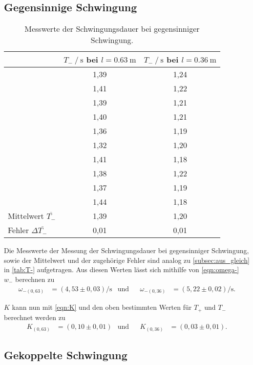 \subsection{Gegensinnige Schwingung}
\label{subsec:aus_gegen}
\begin{table}[H]
  \centering
  \caption{Messwerte der Schwingungsdauer bei gegensinniger Schwingung.}
  \label{tab:T-}
  \begin{tabular}{l S S}
    \toprule
     & {$T_- \mathbin{/} \si{\second}$ bei $l=\qty{0.63}{\meter}$} & {$T_- \mathbin{/} \si{\second}$ bei $l=\qty{0.36}{\meter}$}\\
    \midrule
      &1,39 & 1,24\\
      &1,41 & 1,22\\
      &1,39 & 1,21\\
      &1,40 & 1,21\\
      &1,36 & 1,19\\
      &1,32 & 1,20\\
      &1,41 & 1,18\\
      &1,38 & 1,22\\
      &1,37 & 1,19\\
      &1,44 & 1,18\\
    \midrule
      Mittelwert $\overline{T_-}$& 1,39 & 1,20\\
      Fehler $\Delta \overline{T_-}$& 0,01 & 0,01\\
    \bottomrule
  \end{tabular}
\end{table}
Die Messwerte der Messung der Schwingungsdauer bei gegensinniger Schwingung, sowie der Mittelwert und der zugehörige Fehler sind analog zu
\autoref{subsec:aus_gleich} in \autoref{tab:T-} aufgetragen.
Aus diesen Werten lässt sich mithilfe von \autoref{eqn:omega-} $w_-$ berechnen zu 
\begin{align*}
  \omega_{-(0,63)}&=(4,53 \pm 0,03) \si{\per\second} & \text{und} && \omega_{-(0,36)}&=(5,22 \pm 0,02) \si{\per\second}.
\end{align*}

$K$ kann nun mit \autoref{eqn:K} und den oben bestimmten Werten für $T_+$ und $T_-$ berechnet werden zu
\begin{align*}
  K_{(0,63)}&=(0,10 \pm 0,01) & \text{und} && K_{(0,36)}&=(0,03 \pm 0,01).
\end{align*} 

\subsection{Gekoppelte Schwingung}
\label{subsec:aus_gekoppelt}

